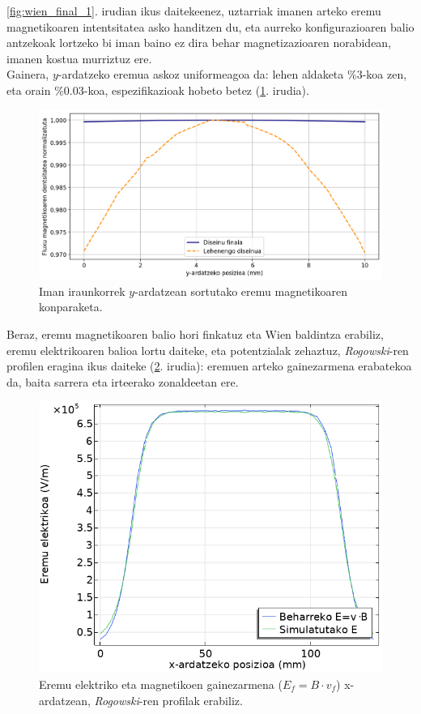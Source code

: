\documentclass[12pt]{article}
\numberwithin{figure}{section}
\numberwithin{equation}{section}
\begin{document}
\ref{fig:wien_final_1}. irudian ikus daitekeenez, uztarriak imanen arteko eremu magnetikoaren intentsitatea asko handitzen du, eta aurreko konfigurazioaren balio antzekoak lortzeko bi iman baino ez dira behar magnetizazioaren norabidean, imanen kostua murriztuz ere.\\

 Gainera, $y$-ardatzeko eremua askoz uniformeagoa da: lehen aldaketa $\% \num{3}$-koa zen, eta orain $\%\num{0.03}$-koa, espezifikazioak hobeto betez (\ref{fig:eremu_magnetikoa_z2}. irudia).\\

\begin{figure}[h]
    \centering
    \includegraphics[width=\linewidth]{4 - Diseinua/eremu_magnetikoa_z_normalizatua.png}
    \caption{Iman iraunkorrek $y$-ardatzean sortutako eremu magnetikoaren konparaketa.}
    \label{fig:eremu_magnetikoa_z2}
\end{figure}

Beraz, eremu magnetikoaren balio hori finkatuz eta Wien baldintza erabiliz, eremu elektrikoaren balioa lortu daiteke, eta potentzialak zehaztuz, \textit{Rogowski}-ren profilen eragina ikus daiteke (\ref{fig:eremu_gainezarmena_2}. irudia): eremuen arteko gainezarmena erabatekoa da, baita sarrera eta irteerako zonaldeetan ere.\\

\begin{figure}[h]
    \centering
    \includegraphics[width=0.6\linewidth]{4 - Diseinua/eremu_gainezarmena_2.png}
    \caption{Eremu elektriko eta magnetikoen gainezarmena ($E_f=B\cdot v_f$) x-ardatzean, \textit{Rogowski}-ren profilak erabiliz.}
    \label{fig:eremu_gainezarmena_2}
\end{figure}
\end{document}
